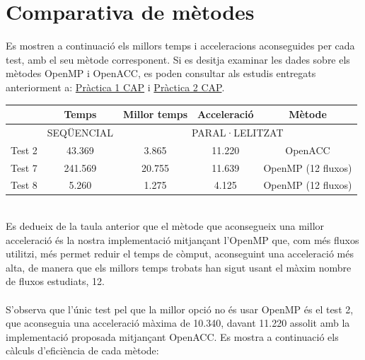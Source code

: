 \documentclass[a4paper, 11pt]{article}
\begin{document}
\section{Comparativa de mètodes}
Es mostren a continuació els millors temps i acceleracions aconseguides per cada test, amb el seu mètode corresponent. Si es desitja examinar les dades sobre els mètodes OpenMP i OpenACC, es poden consultar als estudis entregats anteriorment a:  \textcolor{blue}{\href{https://drive.google.com/file/d/1OXRT-CTcpvjThIazEL3i0cUAJ4ARFBfX/view?usp=sharing}{Pràctica 1 CAP}} i \textcolor{blue}{\href{https://drive.google.com/file/d/1T_Oz_24wRpNrA5BrgScWadKkagXSkpYF/view?usp=sharing}{Pràctica 2 CAP}}. \\
\begin{table}[h]
  \centering
  \begin{tabular}{l||c||c|c|c}
        \multirow{2}{*}{\cellcolor{black}{}} & \textbf{Temps} & \textbf{Millor temps} & \textbf{Acceleració} & \textbf{Mètode}\\\hline
        \cellcolor{black}{} & \multirow{1}{*}{SEQÜENCIAL} & \multicolumn{3}{c}{PARAL·LELITZAT}\\\hline\hline
        Test 2 & 43.369 & 3.865 & 11.220 & OpenACC \\\hline
        Test 7 & 241.569 & 20.755 & 11.639 & OpenMP (12 fluxos) \\\hline
        Test 8 & 5.260 & 1.275 & 4.125 & OpenMP (12 fluxos)\\
    \end{tabular}
\end{table}\\
\hspace{-1.5 em} Es dedueix de la taula anterior que el mètode que aconsegueix una millor acceleració és la nostra implementació mitjançant l'OpenMP que, com més fluxos utilitzi, més permet reduir el temps de còmput, aconseguint una acceleració més alta, de manera que els millors temps trobats han sigut usant el màxim nombre de fluxos estudiats, 12.\\\\
S'observa que l'únic test pel que la millor opció no és usar OpenMP és el test 2, que aconseguia una acceleració màxima de 10.340, davant 11.220 assolit amb la implementació proposada mitjançant OpenACC.
\newpage 
\hspace{-1.5em}Es mostra a continuació els càlculs d'eficiència de cada mètode:\\
\end{document}

